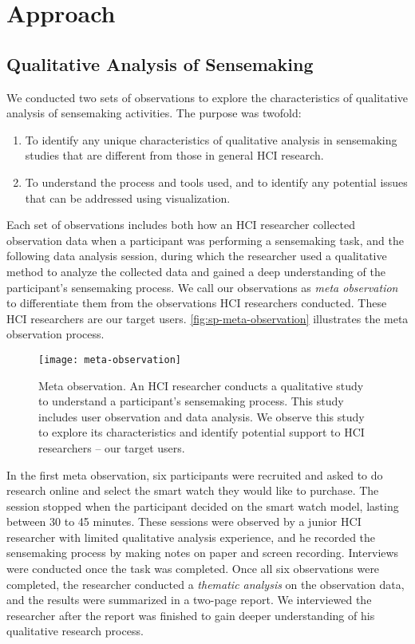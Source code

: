 \section{Approach}

\subsection{Qualitative Analysis of Sensemaking}
We conducted two sets of observations to explore the characteristics of qualitative analysis of sensemaking activities. The purpose was twofold:
\begin{enumerate}
	\item To identify any unique characteristics of qualitative analysis in sensemaking studies that are different from those in general HCI research.
	\item To understand the process and tools used, and to identify any potential issues that can be addressed using visualization.
\end{enumerate}

Each set of observations includes both how an HCI researcher collected observation data when a participant was performing a sensemaking task, and the following data analysis session, during which the researcher used a qualitative method to analyze the collected data and gained a deep understanding of the participant's sensemaking process. We call our observations as \emph{meta observation} to differentiate them from the observations HCI researchers conducted. These HCI researchers are our target users. \autoref{fig:sp-meta-observation} illustrates the meta observation process.

\begin{figure}[!htb]
 	\centering
 	\texttt{[image: meta-observation]}
 	\caption[Meta observation]{Meta observation. An HCI researcher conducts a qualitative study to understand a participant's sensemaking process. This study includes user observation and data analysis. We observe this study to explore its characteristics and identify potential support to HCI researchers -- our target users.}
 	\label{fig:sp-meta-observation}
\end{figure}

In the first meta observation, six participants were recruited and asked to do research online and select the smart watch they would like to purchase. The session stopped when the participant decided on the smart watch model, lasting between 30 to 45 minutes. These sessions were observed by a junior HCI researcher with limited qualitative analysis experience, and he recorded the sensemaking process by making notes on paper and screen recording. Interviews were conducted once the task was completed. Once all six observations were completed, the researcher conducted a \emph{thematic analysis} on the observation data, and the results were summarized in a two-page report. We interviewed the researcher after the report was finished to gain deeper understanding of his qualitative research process.

